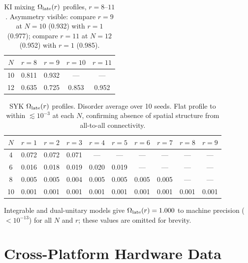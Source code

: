 \documentclass[twocolumn,showpacs,preprintnumbers,amsmath,amssymb,aps,prl]{revtex4-2}
\begin{document}
\begin{table}[h]
\caption{KI mixing $\Omega_{\rm late}(r)$ profiles, $r = 8$--$11$. Asymmetry
visible: compare $r=9$ at $N=10$ (0.932) with $r=1$ (0.977); compare $r=11$ at
$N=12$ (0.952) with $r=1$ (0.985).}
\label{tab:kimixing2}
\begin{ruledtabular}
\begin{tabular}{ccccc}
$N$ & $r{=}8$ & $r{=}9$ & $r{=}10$ & $r{=}11$ \\
\hline
10 & 0.811 & 0.932 & ---   & ---   \\
12 & 0.635 & 0.725 & 0.853 & 0.952 \\
\end{tabular}
\end{ruledtabular}
\end{table}

\begin{table}[h]
\caption{SYK $\Omega_{\rm late}(r)$ profiles. Disorder average over 10 seeds.
Flat profile to within $\lesssim 10^{-3}$ at each $N$, confirming absence of
spatial structure from all-to-all connectivity.}
\label{tab:syk}
\begin{ruledtabular}
\begin{tabular}{cccccccccc}
$N$ & $r{=}1$ & $r{=}2$ & $r{=}3$ & $r{=}4$ & $r{=}5$ & $r{=}6$ & $r{=}7$
    & $r{=}8$ & $r{=}9$ \\
\hline
4  & 0.072 & 0.072 & 0.071 & ---   & ---   & ---   & ---   & ---   & ---   \\
6  & 0.016 & 0.018 & 0.019 & 0.020 & 0.019 & ---   & ---   & ---   & ---   \\
8  & 0.005 & 0.005 & 0.004 & 0.005 & 0.005 & 0.005 & 0.005 & ---   & ---   \\
10 & 0.001 & 0.001 & 0.001 & 0.001 & 0.001 & 0.001 & 0.001 & 0.001 & 0.001 \\
\end{tabular}
\end{ruledtabular}
\end{table}

Integrable and dual-unitary models give $\Omega_{\rm late}(r) = 1.000$ to machine
precision ($< 10^{-13}$) for all $N$ and $r$; these values are omitted for
brevity.

\section{Cross-Platform Hardware Data}
\end{document}
